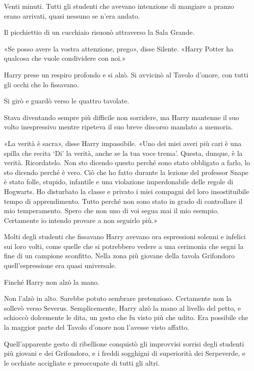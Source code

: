 Venti minuti. Tutti gli studenti che avevano intenzione di mangiare a pranzo erano arrivati, quasi nessuno se n’era andato.

Il picchiettio di un cucchiaio risuonò attraverso la Sala Grande.

«Se posso avere la vostra attenzione, prego», disse Silente. «Harry Potter ha qualcosa che vuole condividere con noi.»

Harry prese un respiro profondo e si alzò. Si avvicinò al Tavolo d’onore, con tutti gli occhi che lo fissavano.

Si girò e guardò verso le quattro tavolate.

Stava diventando sempre più difficile non sorridere, ma Harry mantenne il suo volto inespressivo mentre ripeteva il suo breve discorso mandato a memoria.

«La verità è sacra», disse Harry impassibile. «Uno dei miei averi più cari è una spilla che recita ‘Di’ la verità, anche se la tua voce trema’. Questa, dunque, è la verità. Ricordatelo. Non sto dicendo questo perché sono stato obbligato a farlo, lo sto dicendo perché è vero. Ciò che ho fatto durante la lezione del professor Snape è stato folle, stupido, infantile e una violazione imperdonabile delle regole di Hogwarts. Ho disturbato la classe e privato i miei compagni del loro insostituibile tempo di apprendimento. Tutto perché non sono stato in grado di controllare il mio temperamento. Spero che non uno di voi segua mai il mio esempio. Certamente io intendo provare a non seguirlo più.»

Molti degli studenti che fissavano Harry avevano ora espressioni solenni e infelici sui loro volti, come quelle che si potrebbero vedere a una cerimonia che segni la fine di un campione sconfitto. Nella zona più giovane della tavola Grifondoro quell’espressione era quasi universale.

Finché Harry non alzò la mano.

Non l’alzò in alto. Sarebbe potuto sembrare pretenzioso. Certamente non la sollevò verso Severus. Semplicemente, Harry alzò la mano al livello del petto, e schioccò dolcemente le dita, un gesto che fu visto più che udito. Era possibile che la maggior parte del Tavolo d’onore non l’avesse visto affatto.

Quell’apparente gesto di ribellione conquistò gli improvvisi sorrisi degli studenti più giovani e dei Grifondoro, e i freddi sogghigni di superiorità dei Serpeverde, e le occhiate accigliate e preoccupate di tutti gli altri.

